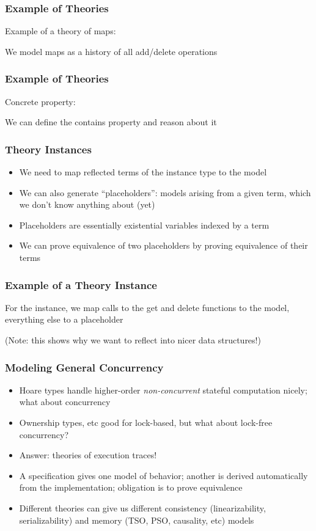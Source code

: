 \documentclass{beamer}
\begin{document}
\begin{frame}
  \frametitle{Example of Theories}

  Example of a theory of maps:
  
  We model maps as a history of all add/delete operations
\end{frame}

\begin{frame}
  \frametitle{Example of Theories}

  Concrete property:
  
  We can define the contains property and reason about it
\end{frame}

\begin{frame}
  \frametitle{Theory Instances}
  \begin{itemize}
    \item We need to map reflected terms of the instance type to the model
    \item We can also generate ``placeholders'': models arising from a
      given term, which we don't know anything about (yet)
    \item Placeholders are essentially existential variables indexed
      by a term
    \item We can prove equivalence of two placeholders by proving
      equivalence of their terms
  \end{itemize}
\end{frame}

\begin{frame}
  \frametitle{Example of a Theory Instance}

  For the instance, we map calls to the get and delete functions to
  the model, everything else to a placeholder
  
  (Note: this shows why we want to reflect into nicer data structures!)
\end{frame}

\begin{frame}
  \frametitle{Modeling General Concurrency}
  \begin{itemize}
    \item Hoare types handle higher-order \emph{non-concurrent}
      stateful computation nicely; what about concurrency
    \item Ownership types, etc good for lock-based, but what about
      lock-free concurrency?
    \item Answer: theories of execution traces!
    \item A specification gives one model of behavior; another is
      derived automatically from the implementation; obligation is to
      prove equivalence
    \item Different theories can give us different consistency
      (linearizability, serializability) and memory (TSO, PSO,
      causality, etc) models
  \end{itemize}
\end{frame}
\end{document}
